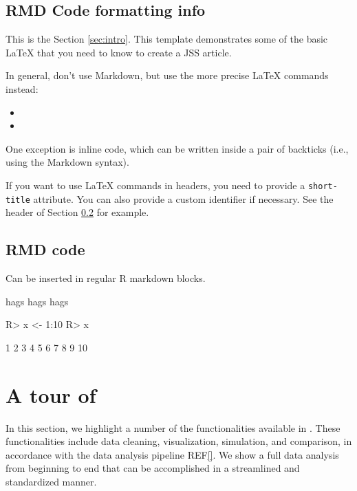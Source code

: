 \documentclass[
  shortnames]{jss}
\begin{document}
\hypertarget{rmd-code-formatting-info}{%
\subsection{RMD Code formatting info}\label{rmd-code-formatting-info}}

This is the Section \ref{sec:intro}. This template demonstrates some of
the basic LaTeX that you need to know to create a JSS article.

In general, don't use Markdown, but use the more precise LaTeX commands
instead:

\begin{itemize}
\item
\item
\end{itemize}

One exception is inline code, which can be written inside a pair of
backticks (i.e., using the Markdown syntax).

If you want to use LaTeX commands in headers, you need to provide a
\texttt{short-title} attribute. You can also provide a custom identifier
if necessary. See the header of Section \ref{r-code} for example.

\subsection[R code]{RMD  code}\label{r-code}

Can be inserted in regular R markdown blocks.

hags hags hags \cite{Neal2004}

\begin{CodeChunk}
\begin{CodeInput}
R> x <- 1:10
R> x
\end{CodeInput}
\begin{CodeOutput}
 [1]  1  2  3  4  5  6  7  8  9 10
\end{CodeOutput}
\end{CodeChunk}

\section[Tour]{A tour of }\label{sec:tour}

In this section, we highlight a number of the functionalities available
in . These functionalities include data cleaning,
visualization, simulation, and comparison, in accordance with the data
analysis pipeline REF\ref{}. We show a full data analysis from beginning
to end that can be accomplished in a streamlined and standardized
manner.
\end{document}
